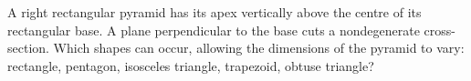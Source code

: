 A right rectangular pyramid has its apex vertically above the centre of its rectangular base. A plane perpendicular to the base cuts a nondegenerate cross-section. Which shapes can occur, allowing the dimensions of the pyramid to vary: rectangle, pentagon, isosceles triangle, trapezoid, obtuse triangle?

